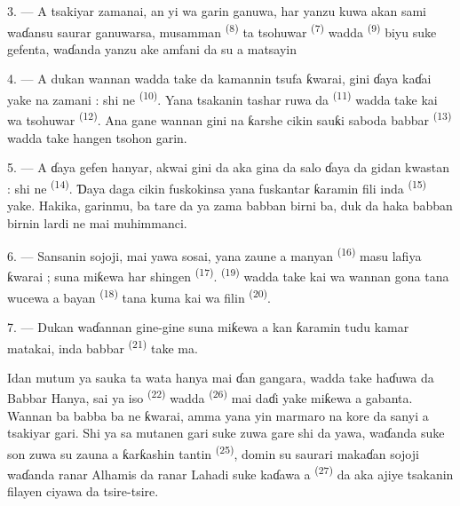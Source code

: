 3. --- A tsakiyar zamanai, an yi wa garin ganuwa, har yanzu kuwa akan
sami waɗansu saurar ganuwarsa, musamman 
\textsuperscript{(8)} ta tsohuwar  \textsuperscript{(7)} wadda
 \textsuperscript{(9)} biyu suke gefenta, waɗanda yanzu
ake amfani da su a matsayin 

4. --- A dukan wannan  wadda take da kamannin tsufa
ƙwarai, gini ɗaya kaɗai yake na zamani : shi ne 
\textsuperscript{(10)}. Yana tsakanin tashar ruwa da 
\textsuperscript{(11)} wadda take kai wa tsohuwar 
\textsuperscript{(12)}. Ana gane wannan gini na ƙarshe cikin sauƙi saboda
babbar  \textsuperscript{(13)} wadda take hangen
tsohon garin.

5. --- A ɗaya gefen hanyar, akwai gini  da aka gina da
salo ɗaya da gidan kwastan : shi ne 
\textsuperscript{(14)}. Ɗaya daga cikin fuskokinsa yana fuskantar ƙaramin
fili inda  \textsuperscript{(15)} yake. Hakika, garinmu,
ba tare da ya zama babban birni ba, duk da haka babban birnin lardi ne
mai muhimmanci.

\VUsaut{5.0mm}
\VUsaut{3.4mm}

6. --- Sansanin sojoji, mai yawa sosai, yana zaune a manyan
 \textsuperscript{(16)} masu lafiya ƙwarai ; suna
miƙewa har shingen 
\textsuperscript{(17)}.  \textsuperscript{(19)} wadda take
kai wa wannan gona tana wucewa a bayan 
\textsuperscript{(18)} tana kuma kai wa filin 
\textsuperscript{(20)}.

7. --- Dukan waɗannan gine-gine suna miƙewa a kan ƙaramin tudu kamar
matakai, inda babbar 
\textsuperscript{(21)} take ma.

Idan mutum ya sauka ta wata hanya mai ɗan gangara, wadda take haɗuwa
da Babbar Hanya, sai ya iso  \textsuperscript{(22)} wadda
 \textsuperscript{(26)} mai daɗi yake miƙewa a
gabanta. Wannan  ba babba ba ne ƙwarai, amma yana
yin marmaro na kore da sanyi a tsakiyar gari. Shi ya sa mutanen gari
suke zuwa gare shi da yawa, waɗanda suke son zuwa su zauna a ƙarƙashin
tantin  \textsuperscript{(25)}, domin su saurari makaɗan
sojoji waɗanda ranar Alhamis da ranar Lahadi suke kaɗawa a
 \textsuperscript{(27)} da aka ajiye tsakanin filayen ciyawa
da tsire-tsire.

